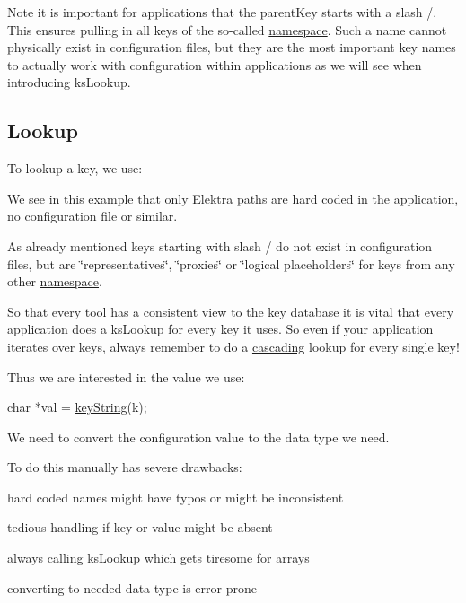 Note it is important for applications that the parent\+Key starts with a slash {\ttfamily /}. This ensures pulling in all keys of the so-\/called \hyperlink{md_doc_help_elektra-namespaces_doc_help_elektra-namespaces_md}{namespace}. Such a name cannot physically exist in configuration files, but they are the most important key names to actually work with configuration within applications as we will see when introducing {\ttfamily ks\+Lookup}.

\subsection*{Lookup}

To lookup a key, we use\+:




We see in this example that only Elektra paths are hard coded in the application, no configuration file or similar.

As already mentioned keys starting with slash {\ttfamily /} do not exist in configuration files, but are \char`\"{}representatives\char`\"{}, \char`\"{}proxies\char`\"{} or \char`\"{}logical placeholders\char`\"{} for keys from any other \hyperlink{md_doc_help_elektra-namespaces_doc_help_elektra-namespaces_md}{namespace}.

So that every tool has a consistent view to the key database it is vital that every application does a {\ttfamily ks\+Lookup} for every key it uses. So even if your application iterates over keys, always remember to do a \hyperlink{doc_tutorials_cascading_md}{cascading} lookup for every single key!

Thus we are interested in the value we use\+:


\begin{DoxyCode}
\textcolor{keywordtype}{char} *val = \hyperlink{group__keyvalue_ga880936f2481d28e6e2acbe7486a21d05}{keyString}(k);
\end{DoxyCode}


We need to convert the configuration value to the data type we need.

To do this manually has severe drawbacks\+:


\begin{DoxyItemize}
\item hard coded names might have typos or might be inconsistent
\item tedious handling if key or value might be absent
\item always calling {\ttfamily ks\+Lookup} which gets tiresome for arrays
\item converting to needed data type is error prone
\end{DoxyItemize}

